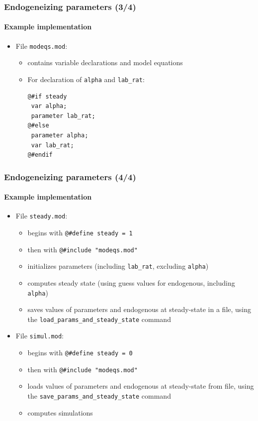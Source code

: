 \documentclass{beamer}
\begin{document}
\begin{frame}[fragile=singleslide]
  \frametitle{Endogeneizing parameters (3/4)}
  \framesubtitle{Example implementation}
  \begin{itemize}
  \item File \texttt{modeqs.mod}:
    \begin{itemize}
    \item contains variable declarations and model equations
    \item For declaration of \texttt{alpha} and \texttt{lab\_rat}:
    \footnotesize
\begin{verbatim}
@#if steady
 var alpha;
 parameter lab_rat;
@#else
 parameter alpha;
 var lab_rat;
@#endif
\end{verbatim}
    \normalsize
    \end{itemize}

  \end{itemize}
\end{frame}

\begin{frame}[fragile=singleslide]
  \frametitle{Endogeneizing parameters (4/4)}
  \framesubtitle{Example implementation}
  \begin{itemize}
  \item File \texttt{steady.mod}:
    \begin{itemize}
    \item begins with \verb+@#define steady = 1+
    \item then with \verb+@#include "modeqs.mod"+
    \item initializes parameters (including \texttt{lab\_rat}, excluding \texttt{alpha})
    \item computes steady state (using guess values for endogenous, including \texttt{alpha})
    \item saves values of parameters and endogenous at steady-state in a file, using the \texttt{load\_params\_and\_steady\_state} command
    \end{itemize}
  \item File \texttt{simul.mod}:
    \begin{itemize}
    \item begins with \verb+@#define steady = 0+
    \item then with \verb+@#include "modeqs.mod"+
    \item loads values of parameters and endogenous at steady-state from file, using the \texttt{save\_params\_and\_steady\_state} command
    \item computes simulations
    \end{itemize}
  \end{itemize}
\end{frame}
\end{document}
